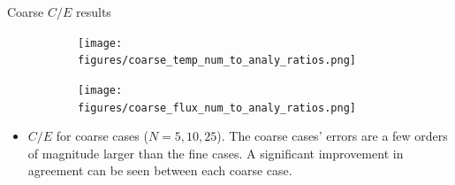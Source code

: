 \documentclass[9pt,t]{beamer}
\begin{document}
\appendix


\begin{frame}{Coarse $C/E$ results}
    \begin{figure}[T]
        \begin{subfigure}{0.475\linewidth}
            \texttt{[image: figures/coarse\_temp\_num\_to\_analy\_ratios.png]}
        \end{subfigure}\hspace{0.3cm}
        \begin{subfigure}{0.475\linewidth}
            \texttt{[image: figures/coarse\_flux\_num\_to\_analy\_ratios.png]}
        \end{subfigure}
    \end{figure}
    \begin{itemize}
        \item $C/E$ for coarse cases ($N=5,10,25$). The coarse cases' errors are a few orders of magnitude larger than the fine cases. A significant improvement in agreement can be seen between each coarse case.
    \end{itemize}
\end{frame}
\end{document}
